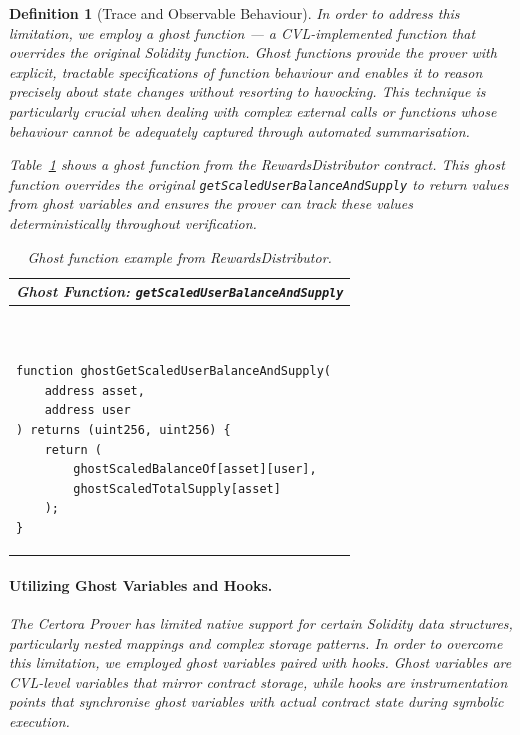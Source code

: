 \documentclass[manuscript,screen,review]{acmart}
\newtheorem{definition}{Definition}
\begin{document}
\begin{definition}[Trace and Observable Behaviour]
In order to address this limitation, we employ a \emph{ghost function} --- a CVL-implemented function that overrides the original Solidity function. Ghost functions provide the prover with explicit, tractable specifications of function behaviour and enables it to reason precisely about state changes without resorting to havocking. This technique is particularly crucial when dealing with complex external calls or functions whose behaviour cannot be adequately captured through automated summarisation.

Table~\ref{lst:ghost_function} shows a ghost function from the RewardsDistributor contract. This ghost function overrides the original \texttt{getScaledUserBalanceAndSupply} to return values from ghost variables and ensures the prover can track these values deterministically throughout verification.

\begin{table}[htb]
\caption{Ghost function example from RewardsDistributor.}
\label{lst:ghost_function}
\centering
\begin{tabular}{|p{}|}
\hline
\multicolumn{1}{|l|}{\cellcolor[HTML]{EFEFEF}\textbf{Ghost Function: \texttt{getScaledUserBalanceAndSupply}}} \\ \hline
\vspace*{-0.4cm}
\begin{verbatim}


function ghostGetScaledUserBalanceAndSupply(
    address asset, 
    address user
) returns (uint256, uint256) {
    return (
        ghostScaledBalanceOf[asset][user], 
        ghostScaledTotalSupply[asset]
    );
}
\end{verbatim}
\\ \hline
\end{tabular}
\end{table}

\paragraph{Utilizing Ghost Variables and Hooks.}

The Certora Prover has limited native support for certain Solidity data structures, particularly nested mappings and complex storage patterns. In order to overcome this limitation, we employed \emph{ghost variables} paired with \emph{hooks}. Ghost variables are CVL-level variables that mirror contract storage, while hooks are instrumentation points that synchronise ghost variables with actual contract state during symbolic execution.


\end{definition}
\end{document}
